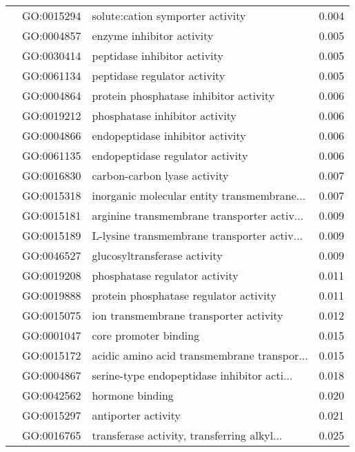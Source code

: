 \begin{longtable}{lllr}
   & GO:0015294 &             solute:cation symporter activity &         0.004 \\
   & GO:0004857 &                    enzyme inhibitor activity &         0.005 \\
   & GO:0030414 &                 peptidase inhibitor activity &         0.005 \\
   & GO:0061134 &                 peptidase regulator activity &         0.005 \\
   & GO:0004864 &       protein phosphatase inhibitor activity &         0.006 \\
   & GO:0019212 &               phosphatase inhibitor activity &         0.006 \\
   & GO:0004866 &             endopeptidase inhibitor activity &         0.006 \\
   & GO:0061135 &             endopeptidase regulator activity &         0.006 \\
   & GO:0016830 &                 carbon-carbon lyase activity &         0.007 \\
   & GO:0015318 &  inorganic molecular entity transmembrane... &         0.007 \\
   & GO:0015181 &  arginine transmembrane transporter activ... &         0.009 \\
   & GO:0015189 &  L-lysine transmembrane transporter activ... &         0.009 \\
   & GO:0046527 &                 glucosyltransferase activity &         0.009 \\
   & GO:0019208 &               phosphatase regulator activity &         0.011 \\
   & GO:0019888 &       protein phosphatase regulator activity &         0.011 \\
   & GO:0015075 &       ion transmembrane transporter activity &         0.012 \\
   & GO:0001047 &                        core promoter binding &         0.015 \\
   & GO:0015172 &  acidic amino acid transmembrane transpor... &         0.015 \\
   & GO:0004867 &  serine-type endopeptidase inhibitor acti... &         0.018 \\
   & GO:0042562 &                              hormone binding &         0.020 \\
   & GO:0015297 &                          antiporter activity &         0.021 \\
   & GO:0016765 &  transferase activity, transferring alkyl... &         0.025 \\

\end{longtable}

